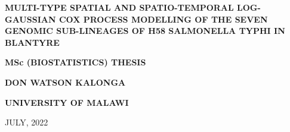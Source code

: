 \documentclass[a4paper]{thesis}
\begin{document}
\begin{titlepage}




\begin{large}
\begin{center}
\textbf{MULTI-TYPE SPATIAL AND SPATIO-TEMPORAL LOG-GAUSSIAN COX PROCESS MODELLING 
OF THE SEVEN GENOMIC SUB-LINEAGES OF H58 SALMONELLA TYPHI 
IN BLANTYRE}\\
\end{center}
\end{large}
\par \bigskip \bigskip \bigskip \bigskip \bigskip \bigskip \bigskip \bigskip \bigskip \bigskip


\begin{large}
\begin{center}
\bf{MSc (BIOSTATISTICS) THESIS}\\
\end{center}
\end{large}

\par \bigskip  \bigskip  \bigskip \bigskip \bigskip \bigskip  \bigskip  \bigskip \bigskip \bigskip

\begin{large}
\begin{center}
\bf{DON WATSON KALONGA}\\
\end{center}
\end{large}

\par \bigskip \bigskip \bigskip \bigskip \bigskip \bigskip \bigskip \bigskip \bigskip \bigskip \bigskip \bigskip \bigskip \bigskip \bigskip \bigskip \bigskip \bigskip 


\begin{large}
\begin{center}
\bf{UNIVERSITY OF MALAWI}\\
\end{center}
\end{large}

\par 

\begin{large}
\begin{center}
JULY, 2022\\
\end{center}
\end{large}

\end{titlepage}
\end{document}
